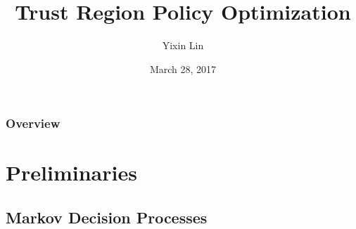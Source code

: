 \documentclass{beamer}
\title[TRPO]{Trust Region Policy Optimization} %
\author{Yixin Lin} %
\institute[Duke] %
{
  Duke University \\ %
  \medskip
  \textit{yixin.lin@duke.edu} %
}
\date{March 28, 2017} %
\begin{document}
\begin{frame}
  \titlepage %
\end{frame}

\begin{frame}
  \frametitle{Overview} %
  \tableofcontents %
\end{frame}




\section{Preliminaries}

\subsection{Markov Decision Processes}
\end{document}
